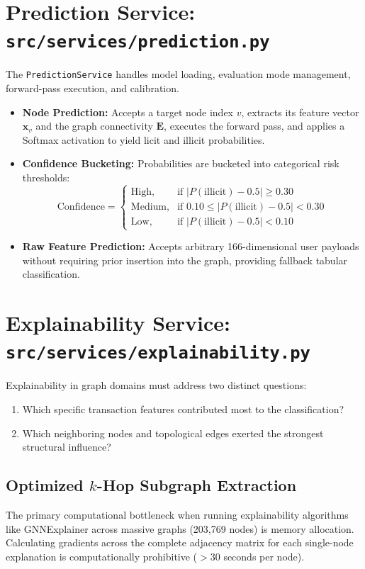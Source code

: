 \documentclass[11pt,a4paper]{report}
\begin{document}
\section{Prediction Service: \texttt{src/services/prediction.py}}
The \texttt{PredictionService} handles model loading, evaluation mode management, forward-pass execution, and calibration.
\begin{itemize}[leftmargin=1.5em]
  \item \textbf{Node Prediction:} Accepts a target node index $v$, extracts its feature vector $\mathbf{x}_v$ and the graph connectivity $\mathbf{E}$, executes the forward pass, and applies a Softmax activation to yield licit and illicit probabilities.
  \item \textbf{Confidence Bucketing:} Probabilities are bucketed into categorical risk thresholds:
  \[
  \text{Confidence} = \begin{cases}
  \text{High}, & \text{if } |P(\text{illicit}) - 0.5| \ge 0.30 \\
  \text{Medium}, & \text{if } 0.10 \le |P(\text{illicit}) - 0.5| < 0.30 \\
  \text{Low}, & \text{if } |P(\text{illicit}) - 0.5| < 0.10
  \end{cases}
  \]
  \item \textbf{Raw Feature Prediction:} Accepts arbitrary 166-dimensional user payloads without requiring prior insertion into the graph, providing fallback tabular classification.
\end{itemize}

\section{Explainability Service: \texttt{src/services/explainability.py}}
Explainability in graph domains must address two distinct questions:
\begin{enumerate}
  \item Which specific transaction features contributed most to the classification?
  \item Which neighboring nodes and topological edges exerted the strongest structural influence?
\end{enumerate}

\subsection{Optimized $k$-Hop Subgraph Extraction}
The primary computational bottleneck when running explainability algorithms like GNNExplainer across massive graphs (203,769 nodes) is memory allocation. Calculating gradients across the complete adjacency matrix for each single-node explanation is computationally prohibitive ($> 30$ seconds per node).
\end{document}
